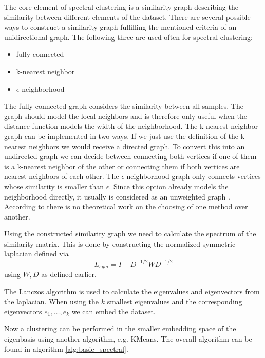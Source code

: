 The core element of spectral clustering is a similarity graph describing the similarity between different elements of the dataset.
There are several possible ways to construct a similarity graph fulfilling the mentioned criteria of an unidirectional graph.
The following three are used often for spectral clustering:
\begin{itemize}
  \item fully connected
  \item k-nearest neighbor
  \item \(\epsilon\)-neighborhood
\end{itemize}
The fully connected graph considers the similarity between all samples. The graph should model the local neighbors and is therefore only useful when the distance function
models the width of the neighborhood.
The k-nearest neighbor graph can be implemented in two ways. If we just use the definition of the k-nearest neighbors we would receive a directed graph.
To convert this into an undirected graph we can decide between connecting both vertices if one of them is a k-nearest neighbor of the other or connecting them if both vertices are nearest neighbors of each other.
The \(\epsilon\)-neighborhood graph only connects vertices whose similarity is smaller than \(\epsilon\).
Since this option already models the neighborhood directly, it usually is considered as an unweighted graph \cite{von_luxburg_tutorial_2007}.
According to \cite{von_luxburg_tutorial_2007} there is no theoretical work on the choosing of one method over
another.

Using the constructed similarity graph we need to calculate the spectrum of the similarity matrix.
This is done by constructing the normalized symmetric laplacian defined via
\[L_{sym} = I - D^{-1/2} W D^{-1/2}\]
using \(W, D\) as defined earlier.

The Lanczos algorithm \cite{lanczos_iteration_1950} is used to calculate the eigenvalues and eigenvectors from the laplacian.
When using the \(k\) smallest eigenvalues and the corresponding eigenvectors \(e_1, \ldots, e_k\) we can embed the dataset.

Now a clustering can be performed in the smaller embedding space of the eigenbasis using another algorithm, e.g. KMeans.
The overall algorithm can be found in algorithm \ref{alg:basic_spectral}.

